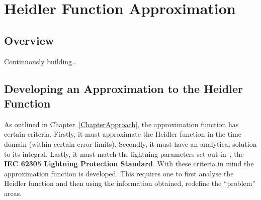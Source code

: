 
\chapter{Heidler Function Approximation} %

\label{ChapterApprox} %

\begin{quote}
\end{quote}


\section{Overview}
\label{sec:approx_overview}

Continuously building\ldots

\section{Developing an Approximation to the Heidler Function}
\label{sec:developing_approximation}

As outlined in Chapter~\ref{ChapterApproach}, the approximation function has certain criteria. Firstly, it must approximate the Heidler function in the time domain (within certain error limits). Secondly, it must have an analytical solution to its integral. Lastly, it must match the lightning parameters set out in~\cite{IEC623051}, the \textbf{IEC 62305 Lightning Protection Standard}. With these criteria in mind the approximation function is developed. This requires one to first analyse the Heidler function and then using the information obtained, redefine the ``problem'' areas.

